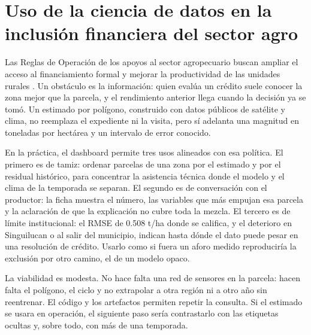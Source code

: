 \section{Uso de la ciencia de datos en la inclusión financiera del sector agro}

Las Reglas de Operación de los apoyos al sector agropecuario buscan ampliar el acceso al financiamiento formal y mejorar la productividad de las unidades rurales \citep{fira2025reglas}. Un obstáculo es la información: quien evalúa un crédito suele conocer la zona mejor que la parcela, y el rendimiento anterior llega cuando la decisión ya se tomó. Un estimado por polígono, construido con datos públicos de satélite y clima, no reemplaza el expediente ni la visita, pero sí adelanta una magnitud en toneladas por hectárea y un intervalo de error conocido.

En la práctica, el dashboard permite tres usos alineados con esa política. El primero es de tamiz: ordenar parcelas de una zona por el estimado y por el residual histórico, para concentrar la asistencia técnica donde el modelo y el clima de la temporada se separan. El segundo es de conversación con el productor: la ficha muestra el número, las variables que más empujan esa parcela y la aclaración de que la explicación no cubre toda la mezcla. El tercero es de límite institucional: el RMSE de 0.508 t/ha donde se califica, y el deterioro en Singuilucan o al salir del municipio, indican hasta dónde el dato puede pesar en una resolución de crédito. Usarlo como si fuera un aforo medido reproduciría la exclusión por otro camino, el de un modelo opaco.

La viabilidad es modesta. No hace falta una red de sensores en la parcela: hacen falta el polígono, el ciclo y no extrapolar a otra región ni a otro año sin reentrenar. El código y los artefactos permiten repetir la consulta. Si el estimado se usara en operación, el siguiente paso sería contrastarlo con las etiquetas ocultas y, sobre todo, con más de una temporada.
